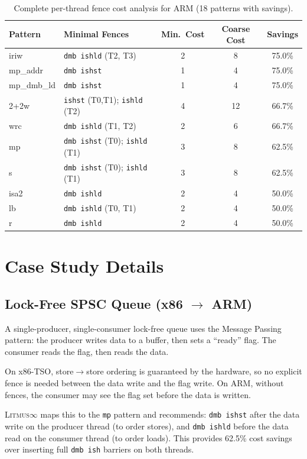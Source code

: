 \documentclass[10pt]{article}
\newcommand{\litmus}{\textsc{Litmus$\infty$}}
\begin{document}
\begin{table}[h]
\centering
\caption{Complete per-thread fence cost analysis for ARM (18 patterns with savings).}
\label{tab:arm-fence-full}
\small
\begin{tabular}{llccc}
\toprule
\textbf{Pattern} & \textbf{Minimal Fences} & \textbf{Min.\ Cost} & \textbf{Coarse Cost} & \textbf{Savings} \\
\midrule
iriw & \texttt{dmb ishld} (T2, T3) & 2 & 8 & 75.0\% \\
mp\_addr & \texttt{dmb ishst} & 1 & 4 & 75.0\% \\
mp\_dmb\_ld & \texttt{dmb ishst} & 1 & 4 & 75.0\% \\
2+2w & \texttt{ishst} (T0,T1); \texttt{ishld} (T2) & 4 & 12 & 66.7\% \\
wrc & \texttt{dmb ishld} (T1, T2) & 2 & 6 & 66.7\% \\
mp & \texttt{dmb ishst} (T0); \texttt{ishld} (T1) & 3 & 8 & 62.5\% \\
s & \texttt{dmb ishst} (T0); \texttt{ishld} (T1) & 3 & 8 & 62.5\% \\
isa2 & \texttt{dmb ishld} & 2 & 4 & 50.0\% \\
lb & \texttt{dmb ishld} (T0, T1) & 2 & 4 & 50.0\% \\
r & \texttt{dmb ishld} & 2 & 4 & 50.0\% \\
\bottomrule
\end{tabular}
\end{table}

\section{Case Study Details}
\label{app:case-studies}

\subsection{Lock-Free SPSC Queue (x86 $\to$ ARM)}

A single-producer, single-consumer lock-free queue uses the Message
Passing pattern: the producer writes data to a buffer, then sets a
``ready'' flag. The consumer reads the flag, then reads the data.

On x86-TSO, store$\to$store ordering is guaranteed by the hardware,
so no explicit fence is needed between the data write and the flag
write. On ARM, without fences, the consumer may see the flag set
before the data is written.

\litmus{} maps this to the \texttt{mp} pattern and recommends:
\texttt{dmb~ishst} after the data write on the producer thread (to
order stores), and \texttt{dmb~ishld} before the data read on the
consumer thread (to order loads). This provides 62.5\% cost savings
over inserting full \texttt{dmb~ish} barriers on both threads.
\end{document}
